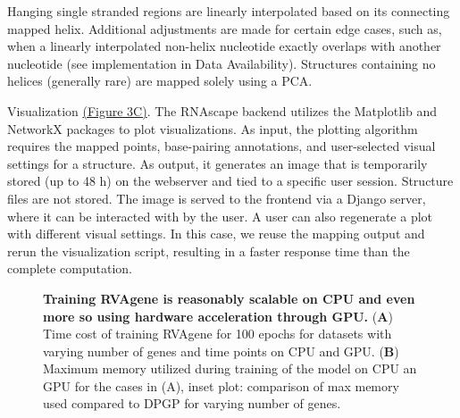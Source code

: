 Hanging single stranded regions are linearly interpolated based on its connecting mapped helix. Additional adjustments are made for certain edge cases, such as, when a linearly interpolated non-helix nucleotide exactly overlaps with another nucleotide (see implementation in Data Availability). Structures containing no helices (generally rare) are mapped solely using a PCA.

Visualization  \hyperref[fig:rnascape3]{(Figure 3C)}. The RNAscape backend utilizes the Matplotlib \citep{Hunter2007,} and NetworkX \citep{Hagberg2008} packages to plot visualizations. As input, the plotting algorithm requires the mapped points, base-pairing annotations, and user-selected visual settings for a structure. As output, it generates an image that is temporarily stored (up to 48 h) on the webserver and tied to a specific user session. Structure files are not stored. The image is served to the frontend via a Django \citep{Django2019} server, where it can be interacted with by the user. A user can also regenerate a plot with different visual settings. In this case, we reuse the mapping output and rerun the visualization script, resulting in a faster response time than the complete computation.
\begin{center}
    \begin{figure}
        \caption[Computational cost of training RVAgene]{\textbf{Training RVAgene is reasonably scalable on CPU and even more so using hardware acceleration through GPU.} ({\bf A}) Time cost of training RVAgene for 100 epochs for datasets with varying number of genes and time points on CPU and GPU. ({\bf B}) Maximum memory utilized during training of the model on CPU an GPU for the cases in (A), inset plot: comparison of max memory used compared to DPGP for varying number of genes.}
  \label{fig:rnascape2}
\end{figure}
\end{center}

